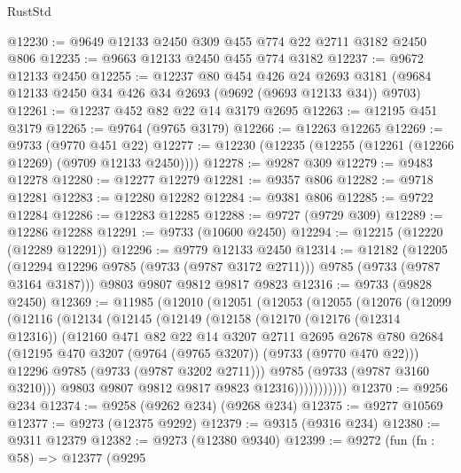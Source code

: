 \begin{lexlean}{RustStd}
\begin{coremodule}
@12230 := @9649 @12133 @2450 @309 @455 @774 @22 @2711 @3182 @2450 @806
@12235 := @9663 @12133 @2450 @455 @774 @3182
@12237 := @9672 @12133 @2450
@12255 := @12237
    @80
    @454
    @426
    @24
    @2693
    @3181
    (@9684 @12133 @2450 @34 @426 @34 @2693 (@9692 (@9693 @12133 @34)) @9703)
@12261 := @12237 @452 @82 @22 @14 @3179 @2695
@12263 := @12195 @451 @3179
@12265 := @9764 (@9765 @3179)
@12266 := @12263 @12265
@12269 := @9733 (@9770 @451 @22)
@12277 := @12230 (@12235 (@12255 (@12261 (@12266 @12269) (@9709 @12133 @2450))))
@12278 := @9287 @309
@12279 := @9483 @12278
@12280 := @12277 @12279
@12281 := @9357 @806
@12282 := @9718 @12281
@12283 := @12280 @12282
@12284 := @9381 @806
@12285 := @9722 @12284
@12286 := @12283 @12285
@12288 := @9727 (@9729 @309)
@12289 := @12286 @12288
@12291 := @9733 (@10600 @2450)
@12294 := @12215 (@12220 (@12289 @12291))
@12296 := @9779 @12133 @2450
@12314 := @12182
    (@12205 (@12294 @12296 @9785 (@9733 (@9787 @3172 @2711))) @9785 (@9733 (@9787 @3164 @3187)))
    @9803
    @9807
    @9812
    @9817
    @9823
@12316 := @9733 (@9828 @2450)
@12369 := @11985
    (@12010
      (@12051
        (@12053
          (@12055
            (@12076
              (@12099
                (@12116
                  (@12134
                    (@12145
                      (@12149
                        (@12158
                          (@12170
                            (@12176 (@12314 @12316))
                            (@12160
                              @471
                              @82
                              @22
                              @14
                              @3207
                              @2711
                              @2695
                              @2678
                              @780
                              @2684
                              (@12195 @470 @3207 (@9764 (@9765 @3207)) (@9733 (@9770 @470 @22)))
                              @12296
                              @9785
                              (@9733 (@9787 @3202 @2711)))
                            @9785
                            (@9733 (@9787 @3160 @3210)))
                          @9803
                          @9807
                          @9812
                          @9817
                          @9823
                          @12316)))))))))))
@12370 := @9256 @234
@12374 := @9258 (@9262 @234) (@9268 @234)
@12375 := @9277 @10569
@12377 := @9273 (@12375 @9292)
@12379 := @9315 (@9316 @234)
@12380 := @9311 @12379
@12382 := @9273 (@12380 @9340)
@12399 := @9272
    (fun (fn : @58) =>
    @12377
      (@9295

\end{coremodule}
\end{lexlean}
